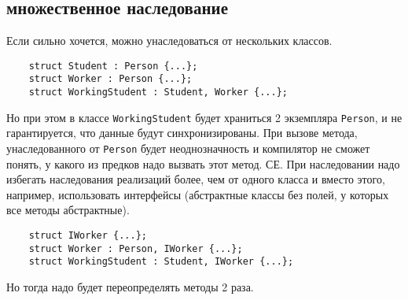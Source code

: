 \documentclass[15pt, a4paper]{article}
\newcommand{\nl}{\newline}
\begin{document}
\subsection{множественное наследование}
Если сильно хочется, можно унаследоваться от нескольких классов.
\begin{verbatim}
    struct Student : Person {...};
    struct Worker : Person {...};
    struct WorkingStudent : Student, Worker {...};
\end{verbatim}
Но при этом в классе \texttt{WorkingStudent} будет храниться 2 экземпляра \texttt{Person},  и не гарантируется, 
что данные будут синхронизированы. При вызове метода, унаследованного от \texttt{Person} будет 
неоднозначность и компилятор не сможет понять, у какого из предков надо вызвать этот метод. СЕ.\nl
При наследовании надо избегать наследования реализаций более, чем от одного класса и вместо этого, например, 
использовать интерфейсы (абстрактные классы без полей, у которых все методы абстрактные).
\begin{verbatim}
    struct IWorker {...};
    struct Worker : Person, IWorker {...};
    struct WorkingStudent : Student, IWorker {...};
\end{verbatim}
Но тогда надо будет переопределять методы 2 раза.\nl
\end{document}
